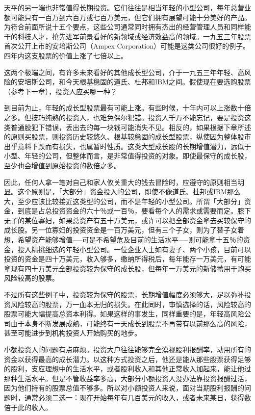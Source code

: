 \documentclass[UTF8,a4paper,zihao=-4,fontset = windows]{ctexart} %
\begin{document}
天平的另一端也非常值得长期投资。它们往往是相当年轻的小型公司，每年总营业额可能只有一百万到六百万或七百万美元，但它们拥有展望可能十分美好的产品。为符合前面所说十五个要点，这些公司通常同时拥有杰出的经营管理人员和同样能干的科技人才，抢先进军前景看好的新领域或经济效益高的领域。一九五三年股票首次公开上市的安培斯公司（Ampex Corporation）可能是这类公司很好的例子。四年内这支股票的价值上涨了七倍以上。

这两个极端之间，有许多未来看好的其他成长型公司，介于一九五三年年轻、高风险的安培斯公司，和今天根基稳固的道氏、杜邦和IBM之间。假使现在要选购股票（参考下一章），投资人应买哪一种？

到目前为止，年轻的成长型股票最有可能上涨。有些时候，十年内可以上涨数十倍之多。但技巧纯熟的投资人，也难免偶尔犯错。投资人千万不能忘记，要是投资这类普通股犯下错误，丢出去的每一块钱可能消失不见。相反的，如果根据下章所述的原则买股票，则投资历史较悠久、根基较稳固的成长型股票，纵使因为整体股市出乎意料下跌而有损失，也属暂时性质。这类大型成长股的长期增值潜力，远低于小型、年轻的公司，但整体而言，是非常值得投资的对象。即使最保守的成长股，至少也会增值到原始投资的数倍之多。

因此，任何人拿一笔对自己和家人攸关重大的钱去冒险时，应遵守的原则相当明显。这个原则是，「大部分」资金投入的公司，即使不像道氏、杜邦或IBM那么大，至少应该比较接近这类型的公司，而不是年轻的小型公司。所谓「大部分」资金，到底是占总投资资金的六十％或一百％，要看每个人的需求或需要而定。膝下无子的某位寡妇，如果总资产有五十万美元，或许可以把全部资金拿去买较保守的成长股。另一位寡妇的投资资金是一百万美元，但有三个子女，则为了替子女着想，希望资产能够增值──可是不希望危及目前的生活水平──则可能拿十五％的资金，投入精挑细选的年轻小型公司。一位企业人士如有妻子、两个小孩，目前可以投资的资金是四十万美元，收入够多，缴纳所得税后，每年能存一万美元，有可能拿现有四十万美元全部投资较为保守的成长股，但每年一万美元的新储蓄用于购买风险较高的股票。

不过所有这些例子中，投资较为保守的股票，长期增值幅度必须够大，足以弥补投资风险较高的股票，万一血本无归的损失。在此同时，审慎选择的话，风险较高的股票可能大幅提高总资本利得。如果这样的事发生，同样重要的是，年轻高风险公司由于本身不断发展成熟，可能终有一天成长到股票不再带有以前那么高的风险，甚至可能进步到机构投资人开始购买的地步。

小额投资人的问题有点麻烦。投资大户往往能够完全漠视股利报酬率，动用所有的资金以获得最高的成长潜力。以这种方式投资之后，他还是能从那些股票获得足够的股利，支应理想中的生活水平，或者股利收入和其他正常收入加起来，能让他过那种生活水平。但是不管收益率多高，大部分小额投资人没办法靠投资报酬过活，因为他们持有的股票总值不够多。所以对小额投资人来说，面对当期股利报酬的问题时，通常必须二选一：现在开始每年有几百美元的收入，或者未来某日，获得数倍于此的收入。
\end{document}
